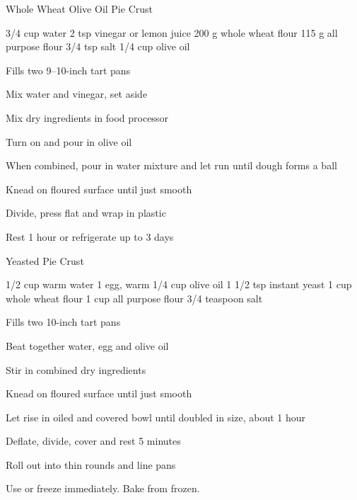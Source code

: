 \begin{recipe}{Whole Wheat Olive Oil Pie Crust}{}
\begin{ingredients}
3/4 cup water
2 tsp vinegar or lemon juice
200 g whole wheat flour
115 g all purpose flour
3/4 tsp salt
1/4 cup olive oil
\end{ingredients}
\nextcolumn
Fills two 9--10-inch tart pans
\begin{steps}
    \item Mix water and vinegar, set aside
    \item Mix dry ingredients in food processor
    \item Turn on and pour in olive oil
    \item When combined, pour in water mixture and let run until dough forms a ball
    \item Knead on floured surface until just smooth
    \item Divide, press flat and wrap in plastic
    \item Rest 1 hour or refrigerate up to 3 days
\end{steps}
\end{recipe}

\begin{recipe}{Yeasted Pie Crust}{}
\begin{ingredients}
1/2 cup warm water
1 egg, warm
1/4 cup olive oil
1 1/2 tsp instant yeast
1 cup whole wheat flour
1 cup all purpose flour
3/4 teaspoon salt
\end{ingredients}
\nextcolumn
Fills two 10-inch tart pans
\begin{steps}
    \item Beat together water, egg and olive oil
    \item Stir in combined dry ingredients
    \item Knead on floured surface until just smooth
    \item Let rise in oiled and covered bowl until doubled in size, about 1 hour
    \item Deflate, divide, cover and rest 5 minutes
    \item Roll out into thin rounds and line pans
\end{steps}
Use or freeze immediately. Bake from frozen.
\end{recipe}
